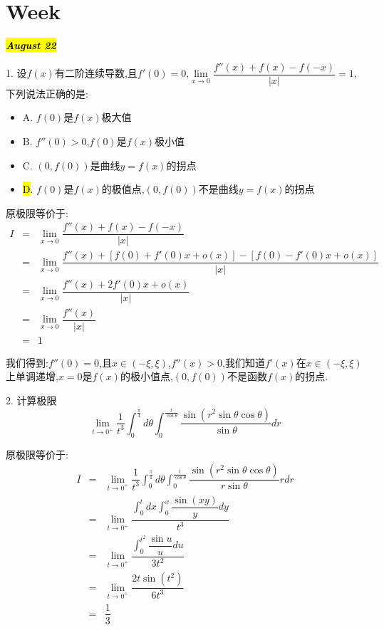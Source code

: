 \section{Week }
\hl{\textbf{\textit{August 22}}}

1. 设$f(x)$有二阶连续导数,且$f'(0)=0$,$\lim\limits_{x\rightarrow 0}\dfrac{f''(x)+f(x)-f(-x)}{|x|}=1$,下列说法正确的是:
\begin{itemize}
	\item A. $f(0)$是$f(x)$极大值
	\item B. $f''(0)>0$,$f(0)$是$f(x)$极小值
	\item C. $(0,f(0))$是曲线$y=f(x)$的拐点
	\item \hl{D}. $f(0)$是$f(x)$的极值点,$(0,f(0))$不是曲线$y=f(x)$的拐点
\end{itemize}
\begin{solution}

	原极限等价于:  
	\begin{eqnarray*}
		I&=&\lim\limits_{x\rightarrow 0}\dfrac{f''(x)+f(x)-f(-x)}{|x|}\\
		&=&\lim\limits_{x\rightarrow 0}\dfrac{f''(x)+\left[f(0)+f'(0)x+o(x)\right] -\left[ f(0)-f'(0)x+o(x)\right]}{|x|}\\
		&=&\lim\limits_{x\rightarrow 0}\dfrac{f''(x)+2f'(0)x+o(x)}{|x|}\\
		&=&\lim\limits_{x\rightarrow 0}\dfrac{f''(x)}{|x|}\\
		&=&1
	\end{eqnarray*}

	我们得到:$f''(0)=0$,且$x\in(-\xi,\xi)$,$f''(x)>0$,我们知道$f'(x)$在$x\in(-\xi,\xi)$上单调递增,$x=0$是$f(x)$的极小值点,$(0,f(0))$不是函数$f(x)$的拐点.
\end{solution}

2. 计算极限$$\lim\limits_{t\rightarrow 0^{+}}\dfrac{1}{t^3}\int_{0}^{\frac{\pi}{4}}d\theta\int_{0}^{\frac{t}{\cos \theta}}\dfrac{\sin(r^2\sin\theta\cos\theta)}{\sin\theta}dr$$
\begin{solution}

	原极限等价于:  
	\begin{eqnarray*}
		I&=&\lim\limits_{t\rightarrow 0^{+}}\dfrac{1}{t^3}\int_{0}^{\frac{\pi}{4}}d\theta\int_{0}^{\frac{t}{\cos \theta}}\dfrac{\sin(r^2\sin\theta\cos\theta)}{r\sin\theta}rdr\\
		&=&\lim\limits_{t\rightarrow 0^{+}}\dfrac{\int_{0}^{t}dx\int_{0}^{x}\dfrac{\sin(xy)}{y}dy}{t^3}\\
		&=&\lim\limits_{t\rightarrow 0^{+}}\dfrac{\int_{0}^{t^2}\dfrac{\sin u}{u}du}{3t^2}\\
		&=&\lim\limits_{t\rightarrow 0^{+}}\dfrac{2t\sin(t^2)}{6t^3}\\
		&=&\dfrac{1}{3}
	\end{eqnarray*}
\end{solution}


